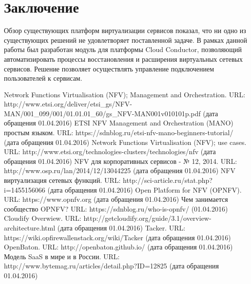 \documentclass[oneside,final,14pt,a4paper]{extreport}
\begin{document}
\chapter*{Заключение}
Обзор существующих платформ виртуализации сервисов показал, что ни одно из существующих решений не удовлетворяет поставленной задаче. В рамках данной работы был разработан модуль для платформы Cloud Conductor, позволяющий автоматизировать процессы восстановления и расширения виртуальных сетевых сервисов. Решение позволяет осуществлять управление подключением пользователей к сервисам. 





\begin{thebibliography}{00}
 Network Functions Virtualisation (NFV); Management and Orchestration. URL: http://www.etsi.org/deliver/etsi\_gs/NFV-MAN/001\_099/001/01.01.01\_60/gs\_NFV-MAN001v010101p.pdf (дата обращения 01.04.2016)
 ETSI NFV Management and Orchestration (MANO) простым языком. URL: https://sdnblog.ru/etsi-nfv-mano-beginners-tutorial/ (дата обращения 01.04.2016)
 Network Functions Virtualisation (NFV); use cases. URL: http://www.etsi.org/technologies-clusters/technologies/nfv (дата обращения 01.04.2016)
 NFV для корпоративных сервисов - № 12, 2014. URL: http://www.osp.ru/lan/2014/12/13044225 (дата обращения 01.04.2016)
 NFV виртуализация сетевых функций. URL: http://sci-article.ru/stat.php?i=1455156066 (дата обращения 01.04.2016)
 Open Platform for NFV (OPNFV). URL: https://www.opnfv.org (дата обращения 01.04.2016)
 Чем занимается сообщество OPNFV? URL:  https://sdnblog.ru/who-is-opnfv/ (01.04.2016)
 Cloudify Overwiew. URL: http://getcloudify.org/guide/3.1/overview-architecture.html (дата обращения 01.04.2016)
 Tacker. URL: https://wiki.opfirewallenstack.org/wiki/Tacker (дата обращения 01.04.2016)
 OpenBaton. URL: http://openbaton.github.io/ (дата обращения 01.04.2016)
 Модель SaaS в мире и в России. URL: http://www.bytemag.ru/articles/detail.php?ID=12825 (дата обращения 01.04.2016)
\end{thebibliography}

\end{document}
